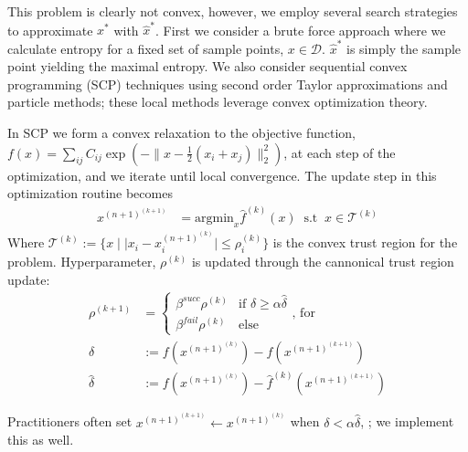 \documentclass[10pt,twocolumn,letterpaper]{article}
\begin{document}
This problem is clearly not convex, however, we employ several search strategies to approximate $x^*$ with $\hat{x}^*$. First we consider a brute force approach where we calculate entropy for a fixed set of sample points, $x \in \mathcal{D}$. $\hat{x}^*$ is simply the sample point yielding the maximal entropy. We also consider sequential convex programming (SCP) techniques using second order Taylor approximations and particle methods; these local methods leverage convex optimization theory.

In SCP we form a convex relaxation to the objective function, $f(x) = \sum_{ij} C_{ij} \exp\left(-\lVert x - \frac{1}{2}(x_i + x_j)\rVert _2^2\right)$, at each step of the optimization, and we iterate until local convergence. The update step in this optimization routine becomes
\begin{align*}
    x^{(n+1)^{(k+1)}} &= \textrm{argmin}_x \hat{f}^{(k)}(x) \;\; \textrm{s.t} \;\; x \in \mathcal{T}^{(k)}
\end{align*}
Where $\mathcal{T}^{(k)} := \{x \mid \lvert x_i - x_i^{(n+1)^{(k)}}\rvert \leq \rho^{(k)}_i\}$ is the convex trust region for the problem. Hyperparameter, $\rho^{(k)}$ is updated through the cannonical trust region update:
\begin{align*}
    \rho^{(k+1)} &= 
    \begin{cases}
        \beta^{succ}\rho^{(k)} & \text{if } \delta \geq \alpha \hat{\delta}\\
        \beta^{fail}\rho^{(k)} & \text{else}
    \end{cases} \text{, for }\\
    \delta &:= f\left(x^{(n+1)^{(k)}}\right) - f\left(x^{(n+1)^{(k+1)}}\right)\\
    \hat{\delta} &:= f\left(x^{(n+1)^{(k)}}\right) - \hat{f}^{(k)}\left(x^{(n+1)^{(k+1)}}\right)
\end{align*}

Practitioners often set $x^{(n+1)^{(k+1)}} \leftarrow x^{(n+1)^{(k)}}$ when $\delta < \alpha \hat{\delta}$, ; we implement this as well.
\end{document}
